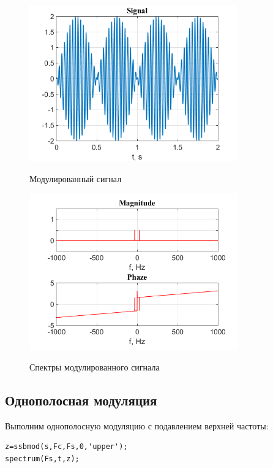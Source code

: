 \documentclass[a4paper,14pt]{article}
\begin{document}
\begin{figure}[h]
\begin{multicols}{1}
\hfill
\includegraphics[width=90mm]{am2}
\hfill
\caption{Модулированный сигнал}
\label{figBottom}
\hfill
\includegraphics[width=90mm]{am2_spec}
\hfill
\caption{Спектры модулированного сигнала}
\label{figDown}
\end{multicols}
\end{figure}


\subsection{Однополосная модуляция}

Выполним однополосную модуляцию с подавлением верхней частоты:

\begin{lstlisting}
z=ssbmod(s,Fc,Fs,0,'upper');
spectrum(Fs,t,z);
\end{lstlisting}
\end{document}
